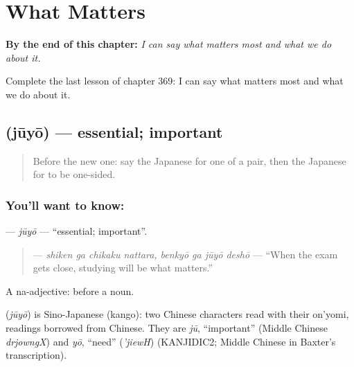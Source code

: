 
\chapter{What Matters}
\label{ch:ja-what-matters}

\begin{chapteropening}
\textbf{By the end of this chapter:} \emph{I can say what matters most and what we do about it.}

Complete the last lesson of chapter 369: I can say what matters most and what we do about it.
\end{chapteropening}

\section[\texorpdfstring{\ja{じゅうよう} (jūyō)}{じゅうよう (jūyō)}]{ (jūyō) — essential; important}

\label{lesson:JA-C369-juuyou}



\begin{quote}
Before the new one: say the Japanese for one of a pair, then the Japanese for to be one-sided.
\end{quote}

\subsection*{You'll want to know: }
\textbf{} — \emph{jūyō} — \textquotedblleft{}essential; important\textquotedblright{}.

\begin{quote}
\textbf{   } — \emph{shiken ga chikaku nattara, benkyō ga jūyō deshō} — \textquotedblleft{}When the exam gets close, studying will be what matters.\textquotedblright{}
\end{quote}

A na-adjective:  before a noun.

\begin{cousinweb}
\textbf{} (\emph{jūyō}) is Sino-Japanese (kango): two Chinese characters read with their on'yomi, readings borrowed from Chinese. They are \emph{jū}, \textquotedblleft{}important\textquotedblright{} (Middle Chinese \emph{drjowngX}) and \emph{yō}, \textquotedblleft{}need\textquotedblright{} (\emph{'jiewH}) (KANJIDIC2; Middle Chinese in Baxter's transcription).
\end{cousinweb}

